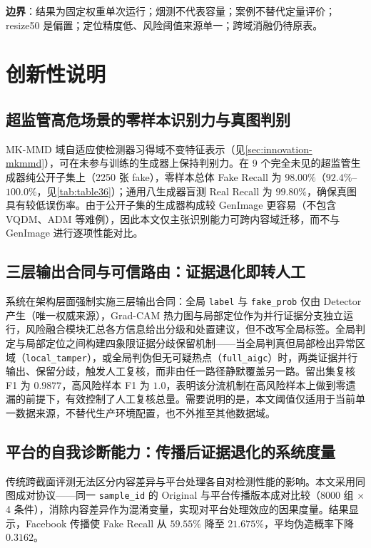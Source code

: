 \documentclass[UTF8, a4paper, 12pt]{ctexart}
\begin{document}
\textbf{边界}：结果为固定权重单次运行；烟测不代表容量；案例不替代定量评价；resize50 是偏置；定位精度低、风险阈值来源单一；跨域消融仍待原表。

\section{创新性说明}

\subsection{超监管高危场景的零样本识别力与真图判别}

MK-MMD 域自适应使检测器习得域不变特征表示（见\ref{sec:innovation-mkmmd}），可在未参与训练的生成器上保持判别力。在 9 个完全未见的超监管生成器纯公开子集上（2250 张 fake），零样本总体 Fake Recall 为 $98.00\%$（$92.4\%$--$100.0\%$，见\cref{tab:table36}）；通用八生成器盲测 Real Recall 为 $99.80\%$，确保真图具有较低误伤率。由于公开子集的生成器构成较 GenImage 更容易（不包含 VQDM、ADM 等难例），因此本文仅主张识别能力可跨内容域迁移，而不与 GenImage 进行逐项性能对比。

\subsection{三层输出合同与可信路由：证据退化即转人工}

系统在架构层面强制实施三层输出合同：全局 \texttt{label} 与 \texttt{fake\_prob} 仅由 Detector 产生（唯一权威来源），Grad-CAM 热力图与局部定位作为并行证据分支独立运行，风险融合模块汇总各方信息给出分级和处置建议，但不改写全局标签。全局判定与局部定位之间构建四象限证据分歧保留机制——当全局判真但局部检出异常区域（\texttt{local\_tamper}），或全局判伪但无可疑热点（\texttt{full\_aigc}）时，两类证据并行输出、保留分歧，触发人工复核，而非由任一路径静默覆盖另一路。留出集复核 F1 为 $0.9877$，高风险样本 F1 为 $1.0$，表明该分流机制在高风险样本上做到零遗漏的前提下，有效控制了人工复核总量。需要说明的是，本文阈值仅适用于当前单一数据来源，不替代生产环境配置，也不外推至其他数据域。

\subsection{平台的自我诊断能力：传播后证据退化的系统度量}

传统跨截面评测无法区分内容差异与平台处理各自对检测性能的影响。本文采用同图成对协议——同一 \texttt{sample\_id} 的 Original 与平台传播版本成对比较（8000 组 $\times$ 4 条件），消除内容差异作为混淆变量，实现对平台处理效应的因果度量。结果显示，Facebook 传播使 Fake Recall 从 $59.55\%$ 降至 $21.675\%$，平均伪造概率下降 $0.3162$。
\end{document}
